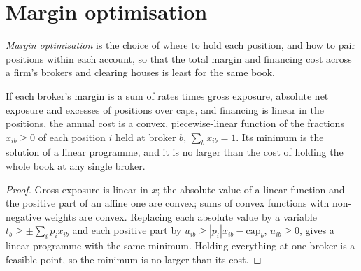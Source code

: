 \label{lst:fm:treasury-and-funding:rules}

\section{Margin optimisation}

\begin{definition}\label{def:fm:treasury-and-funding:optim}
\emph{Margin optimisation} is the choice of where to hold each position, and how to pair positions within each account,
so that the total margin and financing cost across a firm's brokers and clearing houses is least for the same book.
\end{definition}

\begin{proposition}\label{prop:fm:treasury-and-funding:lp}
If each broker's margin is a sum of rates times gross exposure, absolute net exposure and excesses of positions over caps, and financing is linear
in the positions, the annual cost is a convex, piecewise-linear function of the fractions $x_{ib}\ge0$ of each position $i$ held at broker $b$,
$\sum_bx_{ib}=1$. Its minimum is the solution of a linear programme, and it is no larger than the cost of holding the whole book at any single
broker.
\end{proposition}

\begin{proof}
Gross exposure is linear in $x$; the absolute value of a linear function and the positive part of an affine one are convex; sums of convex
functions with non-negative weights are convex. Replacing each absolute value by a variable $t_b\ge\pm\sum_ip_ix_{ib}$ and each positive part by
$u_{ib}\ge|p_i|x_{ib}-\text{cap}_b$, $u_{ib}\ge0$, gives a linear programme with the same minimum. Holding everything at one broker is a
feasible point, so the minimum is no larger than its cost.
\end{proof}

